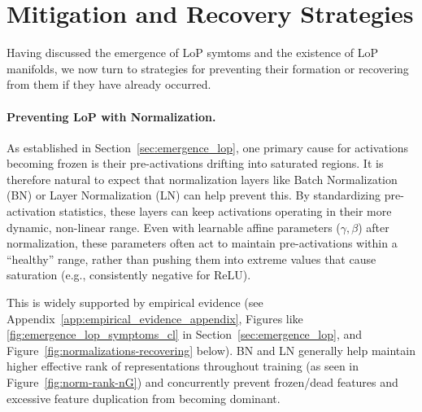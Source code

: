 \documentclass{article}
\numberwithin{figure}{section}
\begin{document}
\section{Mitigation and Recovery Strategies}
\label{sec:mitigation_recovery}
\label{sec:mitigate}
Having discussed the emergence of LoP symtoms and the existence of LoP manifolds, we now turn to strategies for preventing their formation or recovering from them if they have already occurred.



\paragraph{Preventing LoP with Normalization.}
As established in Section~\ref{sec:emergence_lop}, one primary cause for activations becoming frozen is their pre-activations drifting into saturated regions. It is therefore natural to expect that normalization layers like Batch Normalization (BN) or Layer Normalization (LN) can help prevent this. By standardizing pre-activation statistics, these layers can keep activations operating in their more dynamic, non-linear range. Even with learnable affine parameters ($\gamma, \beta$) after normalization, these parameters often act to maintain pre-activations within a ``healthy'' range, rather than pushing them into extreme values that cause saturation (e.g., consistently negative for ReLU).



This is widely supported by empirical evidence (see Appendix~\ref{app:empirical_evidence_appendix}, Figures like \ref{fig:emergence_lop_symptoms_cl} in Section~\ref{sec:emergence_lop}, and Figure~\ref{fig:normalizations-recovering} below). BN and LN generally help maintain higher effective rank of representations throughout training (as seen in Figure~\ref{fig:norm-rank-nG}) and concurrently prevent frozen/dead features and excessive feature duplication from becoming dominant.
\end{document}

